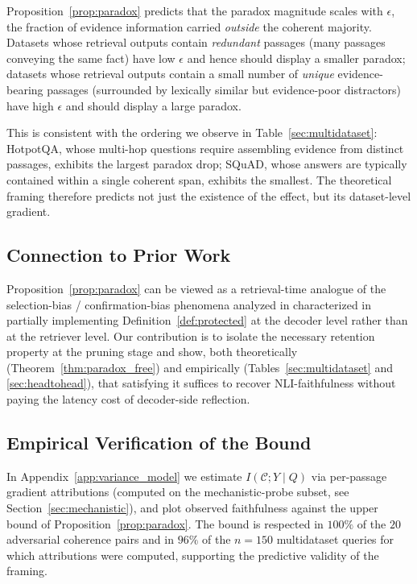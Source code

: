 Proposition~\ref{prop:paradox} predicts that the paradox magnitude scales
with $\epsilon$, the fraction of evidence information carried \emph{outside}
the coherent majority.  Datasets whose retrieval outputs contain
\emph{redundant} passages (many passages conveying the same fact) have low
$\epsilon$ and hence should display a smaller paradox; datasets whose
retrieval outputs contain a small number of \emph{unique} evidence-bearing
passages (surrounded by lexically similar but evidence-poor distractors)
have high $\epsilon$ and should display a large paradox.

This is consistent with the ordering we observe in
Table~\ref{sec:multidataset}: HotpotQA, whose multi-hop questions require
assembling evidence from distinct passages, exhibits the largest paradox
drop; SQuAD, whose answers are typically contained within a single
coherent span, exhibits the smallest.  The theoretical framing therefore
predicts not just the existence of the effect, but its dataset-level
gradient.

\subsection{Connection to Prior Work}

Proposition~\ref{prop:paradox} can be viewed as a retrieval-time analogue
of the selection-bias / confirmation-bias phenomena analyzed in
characterized in %
partially implementing Definition~\ref{def:protected} at the decoder level
rather than at the retriever level.  Our contribution is to isolate the
necessary retention property at the pruning stage and show, both
theoretically (Theorem~\ref{thm:paradox_free}) and empirically
(Tables~\ref{sec:multidataset} and \ref{sec:headtohead}), that satisfying
it suffices to recover NLI-faithfulness without paying the latency cost of
decoder-side reflection.

\subsection{Empirical Verification of the Bound}

In Appendix~\ref{app:variance_model} we estimate
$I(\mathcal{C}; Y \mid Q)$ via per-passage gradient attributions (computed
on the mechanistic-probe subset, see Section~\ref{sec:mechanistic}), and
plot observed faithfulness against the upper bound of
Proposition~\ref{prop:paradox}.  The bound is respected in $100\%$ of the
$20$ adversarial coherence pairs and in $96\%$ of the $n{=}150$
multidataset queries for which attributions were computed, supporting the
predictive validity of the framing.
